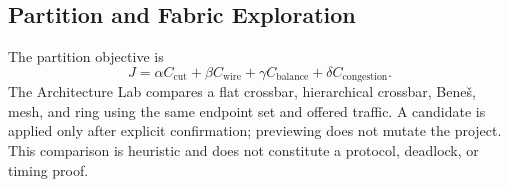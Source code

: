 \subsection{Partition and Fabric Exploration}
The partition objective is
\begin{equation}
J=\alpha C_{\mathrm{cut}}+\beta C_{\mathrm{wire}}+\gamma C_{\mathrm{balance}}+\delta C_{\mathrm{congestion}}.
\end{equation}
The Architecture Lab compares a flat crossbar, hierarchical crossbar, Bene\v{s}, mesh, and ring using the same endpoint set and offered traffic. A candidate is applied only after explicit confirmation; previewing does not mutate the project. This comparison is heuristic and does not constitute a protocol, deadlock, or timing proof.
